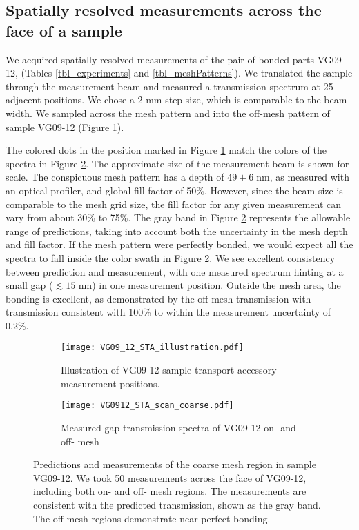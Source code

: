 \documentclass[osajnl,twocolumn,showpacs,superscriptaddress,11pt]{revtex4-1} %
\begin{document}
\subsection{Spatially resolved measurements across the face of a sample}
We acquired spatially resolved measurements of the pair of bonded parts VG09-12, (Tables \ref{tbl_experiments} and \ref{tbl_meshPatterns}).  We translated the sample through the measurement beam and measured a transmission spectrum at 25 adjacent positions.  We chose a 2 mm step size, which is comparable to the beam width.  We sampled across the mesh pattern and into the off-mesh pattern of sample VG09-12 (Figure \ref{figVG0912_STA_illus}).

The colored dots in the position marked in Figure \ref{figVG0912_STA_illus} match the colors of the spectra in Figure \ref{figVG0912}.  The approximate size of the measurement beam is shown for scale.  The conspicuous mesh pattern has a depth of $49\pm6\;$nm, as measured with an optical profiler, and global fill factor of 50\%.  However, since the beam size is comparable to the mesh grid size, the fill factor for any given measurement can vary from about 30\% to 75\%.  The gray band in Figure \ref{figVG0912} represents the allowable range of predictions, taking into account both the uncertainty in the mesh depth and fill factor.  If the mesh pattern were perfectly bonded, we would expect all the spectra to fall inside the color swath in Figure \ref{figVG0912}.  We see excellent consistency between prediction and measurement, with one measured spectrum hinting at a small gap ($\lesssim15$ nm) in one measurement position.  Outside the mesh area, the bonding is excellent, as demonstrated by the off-mesh transmission with transmission consistent with 100\% to within the measurement uncertainty of 0.2\%.


\begin{figure}[htbp]
    \centering
    \begin{subfigure}[b]{0.35\textwidth}
        \texttt{[image: VG09\_12\_STA\_illustration.pdf]}
        \caption{Illustration of VG09-12 sample transport accessory measurement positions. \label{figVG0912_STA_illus} }
    \end{subfigure}
    \begin{subfigure}[b]{0.65\textwidth}
        \texttt{[image: VG0912\_STA\_scan\_coarse.pdf]}
        \caption{Measured gap transmission spectra of VG09-12 on- and off- mesh \label{figVG0912}}
    \end{subfigure}
\caption{Predictions and measurements of the coarse mesh region in sample VG09-12.  We took 50 measurements across the face of VG09-12, including both on- and off- mesh regions.  The measurements are consistent with the predicted transmission, shown as the gray band.  The off-mesh regions demonstrate near-perfect bonding.\label{figVG12sta}}
\end{figure}
\end{document}
